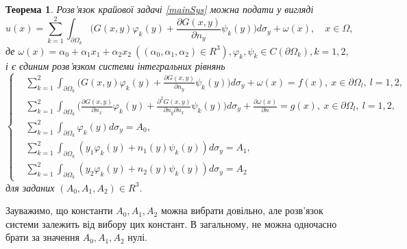 \documentclass[12pt]{report}
\newtheorem{theorem}{Теорема}
\begin{document}
 \begin{theorem}
 	Розв'язок крайової задачі \eqref{mainSys} можна подати у вигляді
	 \begin{equation}
	 	u(x)=\sum_{k=1}^{2}\int_{\partial\Omega_k}\bigg(G(x,y)\varphi_k(y)+\frac{\partial G(x,y)}{\partial n_y}\psi_k(y)\bigg)d\sigma_y+\omega(x), \quad x\in \Omega,
	 \end{equation}
	 де $\omega(x) = \alpha_0+\alpha_1x_1+\alpha_2x_2 \ ((\alpha_0,\alpha_1,\alpha_2)\in R^3), \varphi_k,\psi_k\in C(\partial\Omega_k), k=1,2,$ і є єдиним розв'язком системи інтегральних рівнянь
	 \begin{equation}
	 \left\{
	 	\begin{split}
		\label{system}
	 		&\sum_{k=1}^{2}\int_{\partial\Omega_k}\bigg(G(x,y)\varphi_k(y)+\frac{\partial G(x,y)}{\partial n_y}\psi_k(y)\bigg)d\sigma_y+\omega(x)=f(x), \ x\in\partial\Omega_l, \ l=1,2, \\
			&\sum_{k=1}^{2}\int_{\partial\Omega_k}\bigg(\frac{\partial G(x,y)}{\partial n_x}\varphi_k(y)+\frac{\partial^2 G(x,y)}{\partial n_y\partial n_x}\psi_k(y)\bigg)d\sigma_y+\frac{\partial\omega(x)}{\partial n}=g(x), \ x\in\partial\Omega_l, \ l=1,2, \\
			&\sum_{k=1}^{2}\int_{\partial\Omega_k}\varphi_k(y)d\sigma_y=A_0, \\
			&\sum_{k=1}^{2}\int_{\partial\Omega_k}(y_1\varphi_k(y)+n_1(y)\psi_k(y))d\sigma_y=A_1, \\
			&\sum_{k=1}^{2}\int_{\partial\Omega_k}(y_2\varphi_k(y)+n_2(y)\psi_k(y))d\sigma_y=A_2
		\end{split}
	\right.
	 \end{equation}
	 для заданих $(A_0,A_1,A_2)\in R^3$.
 \end{theorem}
 
  Зауважимо, що константи $A_0,A_1,A_2$ можна вибрати довільно, але розв'язок системи залежить від вибору цих констант. В загальному, не можна одночасно брати за значення $A_0,A_1,A_2$ нулі.
 
\end{document}
